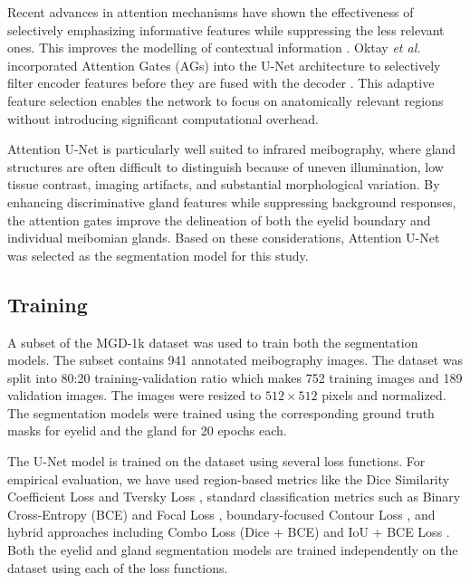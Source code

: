 \documentclass{article}
\begin{document}
Recent advances in attention mechanisms have shown the effectiveness of selectively emphasizing informative features while suppressing the less relevant ones. This improves the modelling of contextual information \cite{vaswani2017attention}. Oktay \textit{et al.} incorporated Attention Gates (AGs) into the U-Net architecture to selectively filter encoder features before they are fused with the decoder \cite{oktay2018attention}. This adaptive feature selection enables the network to focus on anatomically relevant regions without introducing significant computational overhead.


Attention U-Net is particularly well suited to infrared meibography, where gland structures are often difficult to distinguish because of uneven illumination, low tissue contrast, imaging artifacts, and substantial morphological variation. By enhancing discriminative gland features while suppressing background responses, the attention gates improve the delineation of both the eyelid boundary and individual meibomian glands. Based on these considerations, Attention U-Net was selected as the segmentation model for this study.

\subsection{Training}

A subset of the MGD-1k dataset \cite{saha2022automated} was used to train both the segmentation models. The subset contains 941 annotated meibography images. The dataset was split into 80:20 training-validation ratio which makes 752 training images and 189 validation images. The images were resized to $512 \times 512$ pixels and normalized. The segmentation models were trained using the corresponding ground truth masks for eyelid and the gland for 20 epochs each.

The U-Net model is trained on the dataset using several loss functions. For empirical evaluation, we have used region-based metrics like the Dice Similarity Coefficient Loss \cite{milletari2016vnet} and Tversky Loss \cite{salehi2017tversky}, standard classification metrics such as Binary Cross-Entropy (BCE) and Focal Loss \cite{lin2017focal}, boundary-focused Contour Loss \cite{clason2013convex}, and hybrid approaches including Combo Loss (Dice + BCE) \cite{taghanaki2019combo} and IoU + BCE Loss \cite{rahman2016optimizing}. Both the eyelid and gland segmentation models are trained independently on the dataset using each of the loss functions.
\end{document}
